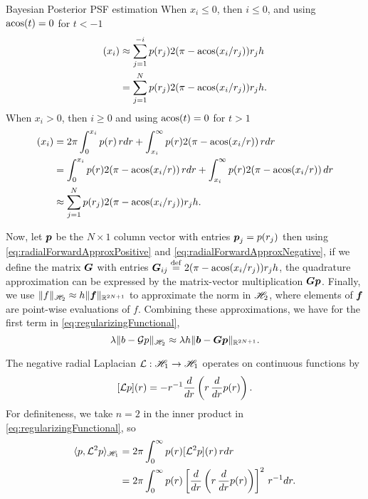 \begin{chapter}{Bayesian Posterior PSF estimation}
When $x_i \le 0$, then $i \le 0$, and using $\operatorname*{acos}(t) = 0$ for $t<-1$
\begin{align}
  [\G p](x_i) 
    &\approx \sum_{j=1}^{-i} p(r_j)2(\pi - \acos(x_i/r_j)) r_jh \nonumber\\
    &= \sum_{j=1}^{N} p(r_j)2(\pi - \acos(x_i/r_j)) r_jh. \label{eq:radialForwardApproxPositive}
\end{align}
When $x_i > 0$, then $i \ge 0$ and using $\operatorname*{acos}(t) = 0$ for $t>1$ 
\begin{align}
  [\G p](x_i) 
    &= 2\pi \int_0^{x_i} p(r)\,rdr + \int_{x_i}^\infty p(r)2(\pi - \acos(x_i/r))\,rdr\nonumber \\
    &= \int_0^{x_i} p(r) 2(\pi - \acos(x_i/r))\,rdr + \int_{x_i}^\infty p(r)2(\pi - \acos(x_i/r))\,dr\nonumber \\
    &\approx \sum_{j=1}^{N} p(r_j)2(\pi - \acos(x_i/r_j)) r_jh. \label{eq:radialForwardApproxNegative}
\end{align}

Now, let $\mbox{\boldmath$p$}$ be the $N\times 1$ column vector with entries $\mbox{\boldmath$p$}_j = p(r_j)$ 
then using \eqref{eq:radialForwardApproxPositive} and \eqref{eq:radialForwardApproxNegative}, if we define the matrix $\mbox{\boldmath$G$}$ with entries $\mbox{\boldmath$G$}_{ij} \stackrel{\rm def}{=} 2(\pi - \operatorname*{acos}(x_i/r_j)) r_j h$, the quadrature approximation can be expressed by the matrix-vector multiplication $\mbox{\boldmath$G$} \mbox{\boldmath$p$}$.
Finally, we use $\|f\|_{\mathscr H_2} \approx h\|\mbox{\boldmath$f$}\|_{\mathbb R^{2N+1}}$ to approximate the norm in $\mathscr H_2$, where elements of $\mbox{\boldmath$f$}$ are point-wise evaluations of $f$.
Combining these approximations, we have for the first term in \eqref{eq:regularizingFunctional},
\begin{equation}
  \lambda \|b - \mathcal G p\|_{\mathscr H_2} \approx \lambda h \|\mbox{\boldmath$b$} - \mbox{\boldmath$G$} \mbox{\boldmath$p$}\|_{\mathbb R^{2N+1}}.
\end{equation}

The negative radial Laplacian $\mathcal L: \mathscr H_1 \to \mathscr H_1$ operates on continuous functions by
\begin{equation} \label{eq:radialLaplacian}
  [\mathcal L p](r) = -r^{-1}\frac{d}{dr}\left(r \,\frac{d}{dr}p(r)\right). 
\end{equation}
For definiteness, we take $n=2$ in the inner product in \eqref{eq:regularizingFunctional}, so
\begin{align} 
  \langle p, \mathcal L^2 p \rangle_{\mathscr H_1}
  &= 2\pi\int_0^\infty p(r) [\mathcal L^2 p](r) \, rdr \nonumber\\
  &= 2\pi\int_0^\infty p(r) \left[\frac{d}{dr}\left(r \,\frac{d}{dr}p(r)\right)\right]^2 \, r^{-1}dr.
  \label{eq:infiniteRadialInnerProduct}
\end{align}


\end{chapter}
